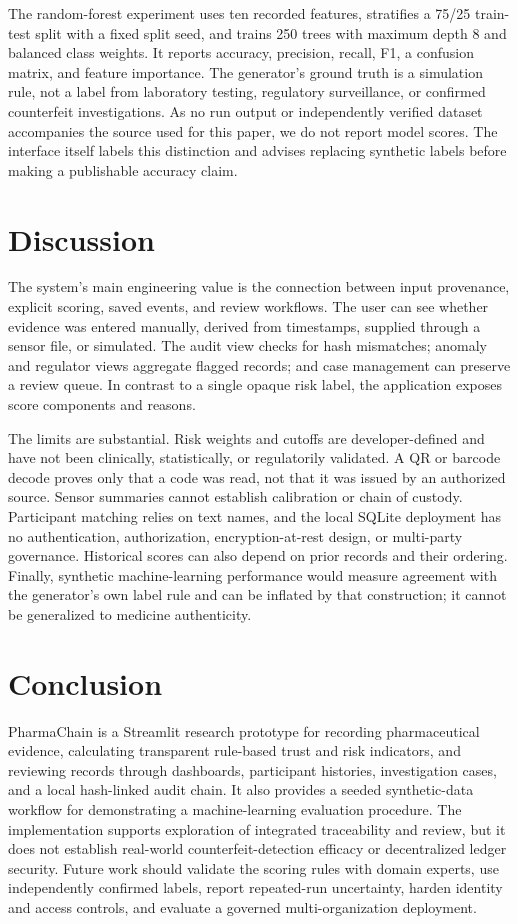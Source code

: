 \documentclass[conference]{IEEEtran}
\begin{document}
The random-forest experiment uses ten recorded features, stratifies a 75/25 train-test split with a fixed split seed, and trains 250 trees with maximum depth 8 and balanced class weights. It reports accuracy, precision, recall, F1, a confusion matrix, and feature importance. The generator's ground truth is a simulation rule, not a label from laboratory testing, regulatory surveillance, or confirmed counterfeit investigations. As no run output or independently verified dataset accompanies the source used for this paper, we do not report model scores. The interface itself labels this distinction and advises replacing synthetic labels before making a publishable accuracy claim.

\section{Discussion}
The system's main engineering value is the connection between input provenance, explicit scoring, saved events, and review workflows. The user can see whether evidence was entered manually, derived from timestamps, supplied through a sensor file, or simulated. The audit view checks for hash mismatches; anomaly and regulator views aggregate flagged records; and case management can preserve a review queue. In contrast to a single opaque risk label, the application exposes score components and reasons.

The limits are substantial. Risk weights and cutoffs are developer-defined and have not been clinically, statistically, or regulatorily validated. A QR or barcode decode proves only that a code was read, not that it was issued by an authorized source. Sensor summaries cannot establish calibration or chain of custody. Participant matching relies on text names, and the local SQLite deployment has no authentication, authorization, encryption-at-rest design, or multi-party governance. Historical scores can also depend on prior records and their ordering. Finally, synthetic machine-learning performance would measure agreement with the generator's own label rule and can be inflated by that construction; it cannot be generalized to medicine authenticity.

\section{Conclusion}
PharmaChain is a Streamlit research prototype for recording pharmaceutical evidence, calculating transparent rule-based trust and risk indicators, and reviewing records through dashboards, participant histories, investigation cases, and a local hash-linked audit chain. It also provides a seeded synthetic-data workflow for demonstrating a machine-learning evaluation procedure. The implementation supports exploration of integrated traceability and review, but it does not establish real-world counterfeit-detection efficacy or decentralized ledger security. Future work should validate the scoring rules with domain experts, use independently confirmed labels, report repeated-run uncertainty, harden identity and access controls, and evaluate a governed multi-organization deployment.
\end{document}
